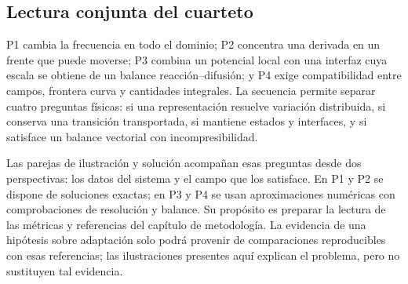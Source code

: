 \subsection{Lectura conjunta del cuarteto}

P1 cambia la frecuencia en todo el dominio; P2 concentra una derivada en un
frente que puede moverse; P3 combina un potencial local con una interfaz cuya
escala se obtiene de un balance reacción--difusión; y P4 exige compatibilidad
entre campos, frontera curva y cantidades integrales. La secuencia permite
separar cuatro preguntas físicas: si una representación resuelve variación
distribuida, si conserva una transición transportada, si mantiene estados y
interfaces, y si satisface un balance vectorial con incompresibilidad.

Las parejas de ilustración y solución acompañan esas preguntas desde dos
perspectivas: los datos del sistema y el campo que los satisface. En P1 y P2
se dispone de soluciones exactas; en P3 y P4 se usan aproximaciones numéricas
con comprobaciones de resolución y balance. Su propósito es preparar la lectura de
las métricas y referencias del capítulo de metodología. La evidencia de una
hipótesis sobre adaptación solo podrá provenir de comparaciones reproducibles
con esas referencias; las ilustraciones presentes aquí explican el problema,
pero no sustituyen tal evidencia.
